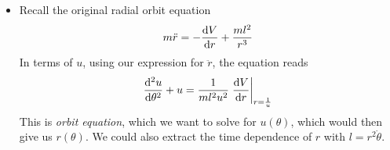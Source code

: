 \documentclass[11pt, a4paper]{article}
\begin{document}
\begin{itemize}
	\item Recall the original radial orbit equation
	\begin{equation*}
		m \ddot{r} = - \dv{V}{r} + \frac{ml^{2}}{r^{3}} 
	\end{equation*}
	In terms of $ u $, using our expression for $ \ddot{r} $, the equation reads
	\begin{equation*}
		\dv[2]{u}{\theta} + u = \frac{1}{ml^{2}u^{2}} \eval{\dv{V}{r}}_{r = \frac{1}{u}}
	\end{equation*}
	This is \textit{orbit equation}, which we want to solve for $ u(\theta) $, which would then give us $ r(\theta) $. We could also extract the time dependence of $ r $ with $ l = r^{2} \dot{\theta}$.

\end{itemize}
\end{document}
